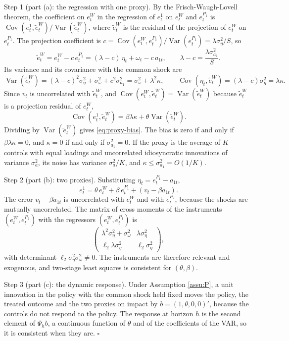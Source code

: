 \documentclass[12pt,a4paper]{article}
\theoremstyle{definition}
\newcommand{\cov}{\operatorname{Cov}}
\newcommand{\var}{\operatorname{Var}}
\begin{document}
Step 1 (part (a): the regression with one proxy). By the Frisch-Waugh-Lovell theorem, the coefficient on $e^W_t$ in the regression of $e^1_t$ on $e^W_t$ and $e^{P_1}_t$ is $\cov(e^1_t,\tilde e^W_t)/\var(\tilde e^W_t)$, where $\tilde e^W_t$ is the residual of the projection of $e^W_t$ on $e^{P_1}_t$. The projection coefficient is $c=\cov(e^W_t,e^{P_1}_t)/\var(e^{P_1}_t)=\lambda\sigma_\eta^2/S$, so
\[
\tilde e^W_t=e^W_t-c\,e^{P_1}_t=(\lambda-c)\,\eta_t+\omega_t-c\,a_{1t},\qquad \lambda-c=\frac{\lambda\sigma_{a_1}^2}{S}.
\]
Its variance and its covariance with the common shock are
\[
\var(\tilde e^W_t)=(\lambda-c)^2\sigma_\eta^2+\sigma_\omega^2+c^2\sigma_{a_1}^2=\sigma_\omega^2+\lambda^2\kappa,\qquad
\cov(\eta_t,\tilde e^W_t)=(\lambda-c)\sigma_\eta^2=\lambda\kappa .
\]
Since $v_t$ is uncorrelated with $\tilde e^W_t$, and $\cov(e^W_t,\tilde e^W_t)=\var(\tilde e^W_t)$ because $\tilde e^W_t$ is a projection residual of $e^W_t$,
\[
\cov(e^1_t,\tilde e^W_t)=\beta\lambda\kappa+\theta\var(\tilde e^W_t).
\]
Dividing by $\var(\tilde e^W_t)$ gives \eqref{eq:proxy-bias}. The bias is zero if and only if $\beta\lambda\kappa=0$, and $\kappa=0$ if and only if $\sigma_{a_1}^2=0$. If the proxy is the average of $K$ controls with equal loadings and uncorrelated idiosyncratic innovations of variance $\sigma_a^2$, its noise has variance $\sigma_a^2/K$, and $\kappa\leq\sigma_{a_1}^2=O(1/K)$.

Step 2 (part (b): two proxies). Substituting $\eta_t=e^{P_1}_t-a_{1t}$,
\[
e^1_t=\theta\,e^W_t+\beta\,e^{P_1}_t+(v_t-\beta a_{1t}).
\]
The error $v_t-\beta a_{1t}$ is uncorrelated with $e^W_t$ and with $e^{P_2}_t$, because the shocks are mutually uncorrelated. The matrix of cross moments of the instruments $(e^W_t,e^{P_2}_t)$ with the regressors $(e^W_t,e^{P_1}_t)$ is
\[
\begin{pmatrix}\lambda^2\sigma_\eta^2+\sigma_\omega^2&\lambda\sigma_\eta^2\\ \ell_2\lambda\sigma_\eta^2&\ell_2\sigma_\eta^2\end{pmatrix},
\]
with determinant $\ell_2\sigma_\eta^2\sigma_\omega^2\neq0$. The instruments are therefore relevant and exogenous, and two-stage least squares is consistent for $(\theta,\beta)$.

Step 3 (part (c): the dynamic response). Under Assumption \ref{assu:P}, a unit innovation in the policy with the common shock held fixed moves the policy, the treated outcome and the two proxies on impact by $b=(1,\theta,0,0)'$, because the controls do not respond to the policy. The response at horizon $h$ is the second element of $\Psi_hb$, a continuous function of $\theta$ and of the coefficients of the VAR, so it is consistent when they are. $\square$
\end{document}
